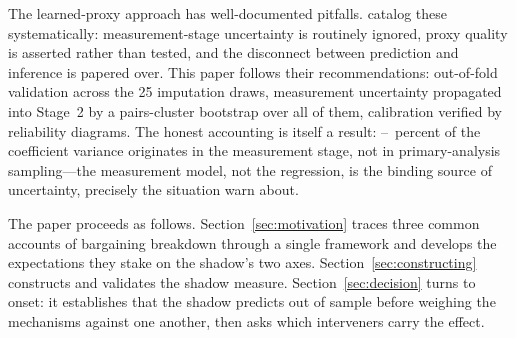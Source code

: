 The learned-proxy approach has well-documented pitfalls.
\citet{knoxlucascho2022} catalog these systematically:
measurement-stage uncertainty is routinely ignored, proxy quality is
asserted rather than tested, and the disconnect between prediction and
inference is papered over.  This paper follows their recommendations: out-of-fold validation
across the 25 imputation draws, measurement uncertainty propagated into
Stage~2 by a pairs-cluster bootstrap over all of them, calibration verified
by reliability diagrams.  The honest accounting is itself a result:
\DirMeasLo--\DirMeasHi\ percent of the coefficient variance originates in
the measurement stage, not in primary-analysis sampling---the measurement
model, not the regression, is the binding source of uncertainty, precisely
the situation \citet{knoxlucascho2022} warn about.

The paper proceeds as follows.  Section~\ref{sec:motivation} traces three
common accounts of bargaining breakdown through a single framework and
develops the expectations they stake on the shadow's two axes.
Section~\ref{sec:constructing} constructs and validates the shadow measure.
Section~\ref{sec:decision} turns to onset: it establishes that the shadow
predicts out of sample before weighing the mechanisms against one another, then
asks which interveners carry the effect.
